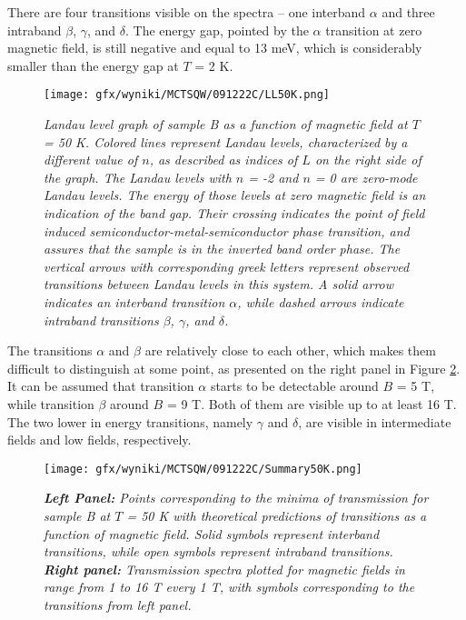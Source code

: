 \documentclass[titlepage,a4paper]{book}
\begin{document}
There are four transitions visible on the spectra -- one interband $\alpha$ and three intraband $\beta$, $\gamma$, and $\delta$. The energy gap, pointed by the $\alpha$ transition at zero magnetic field, is still negative and equal to 13 meV, which is considerably smaller than the energy gap at $T$ = 2 K.

\begin{figure}[ht]
	\centering
	\texttt{[image: gfx/wyniki/MCTSQW/091222C/LL50K.png]}
	\vspace{-10pt}
	\caption{\textit{Landau level graph of sample B as a function of magnetic field at $T$ = 50 K. Colored lines represent Landau levels, characterized by a different value of $n$, as described as indices of $L$ on the right side of the graph. The Landau levels with $n$ = -2 and $n$ = 0 are zero-mode Landau levels. The energy of those levels at zero magnetic field is an indication of the band gap. Their crossing indicates the point of field induced semiconductor-metal-semiconductor phase transition, and assures that the sample is in the inverted band order phase. The vertical arrows with corresponding greek letters represent observed transitions between Landau levels in this system. A solid arrow indicates an interband transition $\alpha$, while dashed arrows indicate intraband transitions $\beta$, $\gamma$, and $\delta$.}}
	\label{fig:LL_SQW_50K}
\end{figure}

The transitions $\alpha$ and $\beta$ are relatively close to each other, which makes them difficult to distinguish at some point, as presented on the right panel in Figure \ref{fig:Summary_SQW_50K}. It can be assumed that transition $\alpha$ starts to be detectable around $B$ = 5 T, while transition $\beta$ around $B$ = 9 T. Both of them are visible up to at least 16 T. The two lower in energy transitions, namely $\gamma$ and $\delta$, are visible in intermediate fields and low fields, respectively.
\begin{figure}[ht]
	\centering
	\texttt{[image: gfx/wyniki/MCTSQW/091222C/Summary50K.png]}
	\vspace{-10pt}
	\caption{\textit{\textbf{Left Panel:} Points corresponding to the minima of transmission for sample B at $T$ = 50 K with theoretical predictions of transitions as a function of magnetic field. Solid symbols represent interband transitions, while open symbols represent intraband transitions. \textbf{Right panel:} Transmission spectra plotted for magnetic fields in range from 1 to 16 T every 1 T, with symbols corresponding to the transitions from left panel.}}
	\label{fig:Summary_SQW_50K}
\end{figure}
\end{document}
